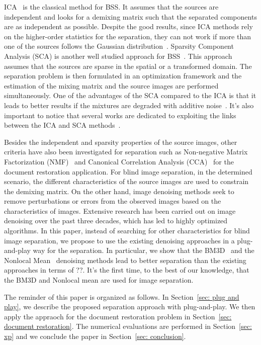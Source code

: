 \documentclass[conference]{IEEEtran}
\theoremstyle{plain}
\begin{document}
ICA~\cite{hyvarinen2004independent} is the classical method for BSS. It assumes that the sources are independent and looks for a demixing matrix such that the separated components are as independent as possible. Despite the good results, since ICA methods rely on the higher-order statistics for the separation, they can not work if more than one of the sources follows the Gaussian distribution~\cite{nordhausen2018independent}. Sparsity Component Analysis (SCA) is another well studied approach for BSS~\cite{souidene2007blind, zibulevsky2001blind,bobin2007sparsity}. This approach assumes that the sources are sparse in the spatial or a transformed domain. The separation problem is then formulated in an optimization framework and the estimation of the mixing matrix and the source images are performed simultaneously. One of the advantages of the SCA compared to the ICA is that it leads to better results if the mixtures are degraded with additive noise~\cite{bobin2007sparsity}. It's also important to notice that several works are dedicated to exploiting the links between the ICA and SCA methods~\cite{feng2018revisiting,bronstein2005sparse}.

Besides the independent and sparsity properties of the source images, other criteria have also been investigated for separation such as Non-negative Matrix Factorization (NMF)~\cite{merrikh2010using} and Canonical Correlation Analysis (CCA)~\cite{boccuto2019blind} for the document restoration application. For blind image separation, in the determined scenario, the different characteristics of the source images are used to constrain the demixing matrix. On the other hand, image denoising methods seek to remove perturbations or errors from the observed images based on the characteristics of images. Extensive research has been carried out on image denoising over the past three decades, which has led to highly optimized algorithms. In this paper, instead of searching for other characteristics for blind image separation, we propose to use the existing denoising approaches in a plug-and-play way for the separation. In particular, we show that the BM3D~\cite{dabov2007image} and the Nonlocal Mean~\cite{buades2005non} denoising methods lead to better separation than the existing approaches in terms of ??. It's the first time, to the best of our knowledge, that the BM3D and Nonlocal mean are used for image separation.

The reminder of this paper is organized as follows. In Section~\ref{sec: plug and play}, we describe the proposed separation approach with plug-and-play. We then apply the appraoch for the document restoration problem in Section~\ref{sec: document restoration}. The numerical evaluations are performed in Section~\ref{sec: xp} and we conclude the paper in Section~\ref{sec: conclusion}.  
\end{document}
